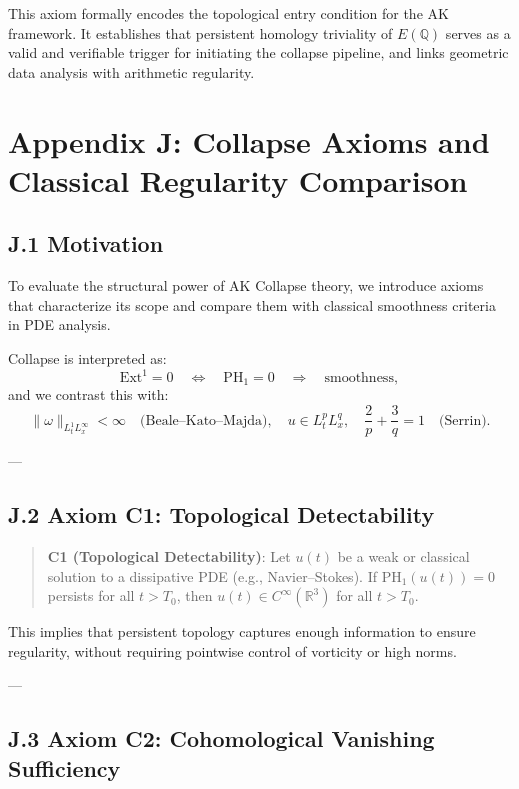 \vspace{1em}
\noindent
This axiom formally encodes the topological entry condition for the AK framework.  
It establishes that persistent homology triviality of \( E(\mathbb{Q}) \) serves as a valid and verifiable trigger  
for initiating the collapse pipeline, and links geometric data analysis with arithmetic regularity.



\section*{Appendix J: Collapse Axioms and Classical Regularity Comparison}

\subsection*{J.1 Motivation}

To evaluate the structural power of AK Collapse theory, we introduce  
axioms that characterize its scope and compare them with classical smoothness criteria in PDE analysis.

Collapse is interpreted as:
\[
\mathrm{Ext}^1 = 0 \quad \Leftrightarrow \quad \mathrm{PH}_1 = 0 \quad \Rightarrow \quad \text{smoothness},
\]
and we contrast this with:
\[
\|\omega\|_{L^1_t L^\infty_x} < \infty \quad \text{(Beale–Kato–Majda)}, \quad
u \in L^p_t L^q_x, \quad \frac{2}{p} + \frac{3}{q} = 1 \quad \text{(Serrin)}.
\]

---

\subsection*{J.2 Axiom C1: Topological Detectability}

\begin{quote}
\textbf{C1 (Topological Detectability)}:  
Let \( u(t) \) be a weak or classical solution to a dissipative PDE (e.g., Navier–Stokes).  
If \( \mathrm{PH}_1(u(t)) = 0 \) persists for all \( t > T_0 \), then \( u(t) \in C^\infty(\mathbb{R}^3) \) for all \( t > T_0 \).
\end{quote}

This implies that persistent topology captures enough information to ensure regularity,  
without requiring pointwise control of vorticity or high norms.

---

\subsection*{J.3 Axiom C2: Cohomological Vanishing Sufficiency}

